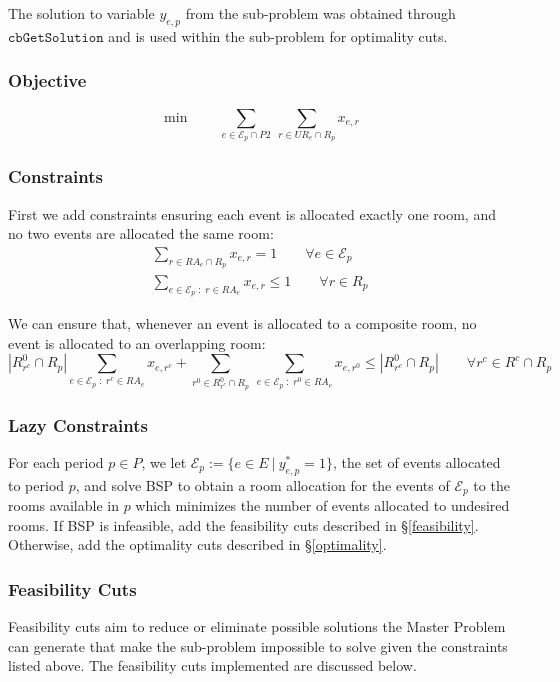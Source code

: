 \documentclass{article}
\newcommand{\E}{\mathcal{E}}
\begin{document}
The solution to variable $y_{e, p}$ from the sub-problem was obtained through $\texttt{cbGetSolution}$ and is used within the sub-problem for optimality cuts.

\subsubsection*{Objective}
\begin{equation}
    \min \qquad \sum_{e \in \E_p \cap P2} \
        \sum_{r \in UR_e \cap R_p} x_{e,r}
\end{equation}

\subsubsection*{Constraints}
First we add constraints ensuring each event is allocated exactly one room, and
no two events are allocated the same room:
\begin{gather}
    \sum_{r \in RA_e \cap R_p} x_{e,r} = 1 \qquad \forall e \in \E_p \\
    \sum_{e \in \E_p \; : \; r \in RA_e} x_{e, r} \leq 1 \qquad \forall r \in R_p
\end{gather}

We can ensure that, whenever an event is allocated to a composite room, no event
is allocated to an overlapping room:
\begin{equation}
    |R^0_{r^c} \cap R_p| \sum_{e \in \E_p \; : \; r^c \in RA_e} x_{e, r^c}
        + \sum_{r^0 \in R^0_{r^c} \cap R_p} \ \sum_{e \in \E_p \; : \; r^0 \in RA_e}
        x_{e, r^0} \leq |R^0_{r^c} \cap R_p| \qquad \forall r^c \in R^c \cap R_p
\end{equation}


\subsubsection*{Lazy Constraints}
For each period $p \in P$, we let $\E_p := \{e \in E \ | \ y^*_{e, p} = 1\}$, the
set of events allocated to period $p$, and solve BSP to obtain a room allocation
for the events of $\E_p$ to the rooms available in $p$ which minimizes the number
of events allocated to undesired rooms. If BSP is infeasible, add the feasibility
cuts described in \S\ref{feasibility}. Otherwise, add the optimality cuts described
in \S\ref{optimality}.

\subsubsection*{Feasibility Cuts}\label{feasibility}
Feasibility cuts aim to reduce or eliminate possible solutions the Master Problem can generate that make the sub-problem impossible to solve given the constraints listed above. The feasibility cuts implemented are discussed below. \medbreak %
\end{document}
